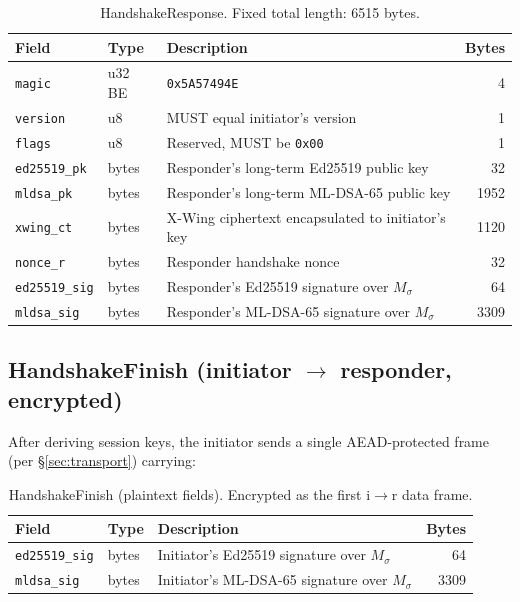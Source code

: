 \documentclass[11pt,a4paper]{article}
\begin{document}
\begin{table}[H]
\centering
\begin{tabularx}{\textwidth}{llXr}
\toprule
\textbf{Field} & \textbf{Type} & \textbf{Description} & \textbf{Bytes} \\
\midrule
\texttt{magic}      & u32 BE & \texttt{0x5A57494E}                                & 4 \\
\texttt{version}    & u8     & MUST equal initiator's version                     & 1 \\
\texttt{flags}      & u8     & Reserved, MUST be \texttt{0x00}                    & 1 \\
\texttt{ed25519\_pk}& bytes  & Responder's long-term Ed25519 public key           & 32 \\
\texttt{mldsa\_pk}  & bytes  & Responder's long-term ML-DSA-65 public key         & 1952 \\
\texttt{xwing\_ct}  & bytes  & X-Wing ciphertext encapsulated to initiator's key  & 1120 \\
\texttt{nonce\_r}   & bytes  & Responder handshake nonce                          & 32 \\
\texttt{ed25519\_sig}& bytes & Responder's Ed25519 signature over $M_{\sigma}$    & 64 \\
\texttt{mldsa\_sig} & bytes  & Responder's ML-DSA-65 signature over $M_{\sigma}$  & 3309 \\
\bottomrule
\end{tabularx}
\caption{HandshakeResponse. Fixed total length: 6515 bytes.}
\end{table}

\subsection{HandshakeFinish (initiator $\to$ responder, encrypted)}

After deriving session keys, the initiator sends a single AEAD-protected
frame (per \S\ref{sec:transport}) carrying:

\begin{table}[H]
\centering
\begin{tabularx}{\textwidth}{llXr}
\toprule
\textbf{Field} & \textbf{Type} & \textbf{Description} & \textbf{Bytes} \\
\midrule
\texttt{ed25519\_sig}& bytes & Initiator's Ed25519 signature over $M_{\sigma}$    & 64 \\
\texttt{mldsa\_sig} & bytes  & Initiator's ML-DSA-65 signature over $M_{\sigma}$  & 3309 \\
\bottomrule
\end{tabularx}
\caption{HandshakeFinish (plaintext fields). Encrypted as the first
i$\to$r data frame.}
\end{table}
\end{document}
